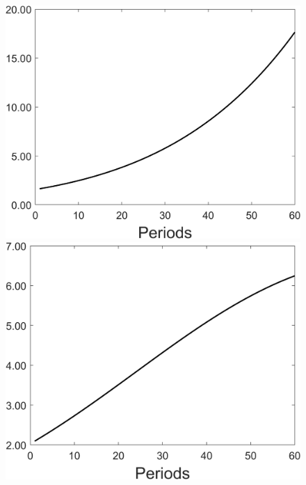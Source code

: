 \begin{figure}[h!!]
\begin{minipage}[]{0.32\textwidth}
	\end{minipage}
	\begin{minipage}[]{0.32\textwidth}
		\includegraphics[width=1\textwidth]{../codding_model/Own/figures/Rep_agent/staticonlyRam_separate_yd_periods59_eppsilon0.40_zeta1.40_Ad08_Ac04_thetac0.70_thetad0.56_HetGrowth1_tauul0.181_util0_withtarget0_lgd0.png}
	\end{minipage}
	\begin{minipage}[]{0.32\textwidth}
		\includegraphics[width=1\textwidth]{../codding_model/Own/figures/Rep_agent/staticonlyRam_separate_xd_periods59_eppsilon0.40_zeta1.40_Ad08_Ac04_thetac0.70_thetad0.56_HetGrowth1_tauul0.181_util0_withtarget0_lgd0.png}

\end{minipage}
\end{figure}
